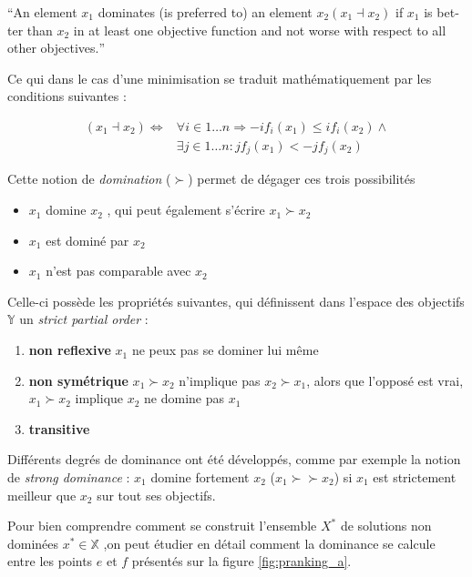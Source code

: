 \foreignquote{english}{An element $x_1$ dominates (is preferred to) an element $x_2 (x_1 \dashv x_2)$ if $x_1$ is better than $x_2$ in at least one objective function and not worse with respect to all other objectives.} 

Ce qui dans le cas d'une minimisation se traduit mathématiquement par les conditions suivantes : 

\begin{align*}
	(x_1 \dashv x_2) \Leftrightarrow &\forall i \in 1 \dotsc n \Rightarrow - i f_i (x_1) \leq i f_i (x_2) \land \\
	&\exists j \in 1 \dotsc n : j f_j (x_1) < - j f_j (x_2)
\end{align*}

Cette notion de \textit{domination} ($\succ$)  permet de dégager ces trois possibilités

\begin{itemize}
\item $x_1$ domine $x_2$ , qui peut également s'écrire $x_1 \succ x_2$
\item $x_1$ est dominé par $x_2$
\item $x_1$ n'est pas comparable avec $x_2$
\end{itemize}

Celle-ci possède les propriétés suivantes, qui définissent dans l'espace des objectifs $\mathbb{Y}$ un \textit{strict partial order} : 

\begin{enumerate}
\item{\textbf{non reflexive}}  $x_1$ ne peux pas se dominer lui même
\item{\textbf{non symétrique}} $ x_1 \succ x_2$ n'implique pas $x_2 \succ x_1$, alors que l'opposé est vrai, $x_1 \succ x_2$ implique $x_2$ ne domine pas $x_1$
\item{\textbf{transitive} }
\end{enumerate}

Différents degrés de dominance ont été développés, comme par exemple la notion de \textit{strong dominance} : $x_1$ domine fortement $x_2$ ($x_1 \succ \succ x_2$) si $x_1$ est strictement meilleur que $x_2$ sur tout ses objectifs. 

Pour bien comprendre comment se construit l'ensemble $X^*$ de solutions non dominées $x^* \in \mathbb{X}$ ,on peut étudier en détail comment la dominance se calcule entre les points $e$ et $f$ présentés sur la figure \ref{fig:pranking_a}.

